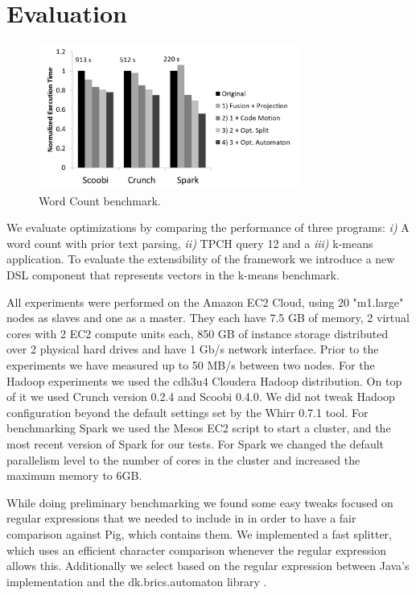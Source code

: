 \section{Evaluation}
\label{sec:evaluation}
\begin{figure}[t]
    \includegraphics[width=8.6cm]{figures/word-count}
   \caption{Word Count benchmark.}
   \label{fig:word-count}%
\end{figure}
We evaluate \tool optimizations by comparing the performance of three programs: \emph{i)} A word count with prior text parsing, \emph{ii)} TPCH \cite{tpch} query 12 and a  \emph{iii)} k-means application. To evaluate the extensibility of the framework we introduce a new DSL component that represents vectors in the k-means benchmark.

All experiments were performed on the Amazon EC2 Cloud, using 20 "m1.large" nodes as slaves and one as a master. They each have 7.5 GB of memory, 2 virtual cores with 2 EC2 compute units each, 850 GB of instance storage distributed over 2 physical hard drives and have 1 Gb/s network interface. Prior to the experiments we have measured up to 50 MB/s between two nodes. For the Hadoop experiments we used the cdh3u4 Cloudera Hadoop distribution. On top of it we used Crunch version 0.2.4 and Scoobi 0.4.0. We did not tweak Hadoop configuration beyond the default settings set by the Whirr 0.7.1 \cite{whirr} tool. For benchmarking Spark we used the Mesos \cite{hindman_mesos:_2011} EC2 script to start a cluster, and the most recent version of Spark for our tests. For Spark we changed the default parallelism level to the number of cores in the cluster and increased the maximum memory to 6GB. 

While doing preliminary benchmarking we found some easy tweaks focused on regular expressions that we needed to include in \tool in order to have a fair comparison against Pig, which contains them. We implemented a fast splitter, which uses an efficient character comparison whenever the regular expression allows this. Additionally we select based on the regular expression between Java's implementation and the dk.brics.automaton library \cite{mollerdk}.

